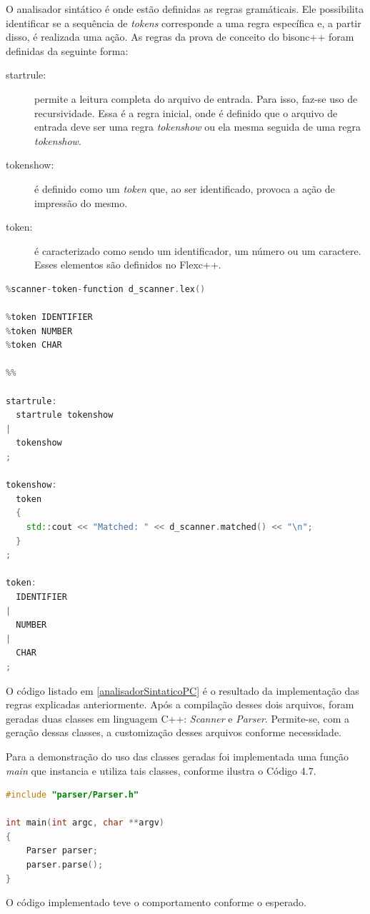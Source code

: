 \par 
\indent O analisador sintático é onde estão definidas as regras gramáticais. Ele possibilita identificar se a sequência de \textit{tokens} corresponde a uma regra específica e, a partir disso, é realizada uma ação. As regras da prova de conceito do bisonc++ foram definidas da seguinte forma:
\begin{description}
\item[startrule:] permite a leitura completa do arquivo de entrada. Para isso, faz-se uso de recursividade. Essa é a regra inicial, onde é definido que o arquivo de entrada deve ser uma regra \textit{tokenshow} ou ela mesma seguida de uma regra \textit{tokenshow}.
\item[tokenshow:] é definido como um \textit{token} que, ao ser identificado, provoca a ação de impressão do mesmo.
\item[token:] é caracterizado como sendo um identificador, um número ou um caractere. Esses elementos são definidos no Flexc++.
\end{description} 

\begin{lstlisting}[language=C++, label=analisadorSintaticoPC, caption=Analisador Sintático da Prova de Conceito do Bisonc++]
%scanner                ../scanner/Scanner.h
%scanner-token-function d_scanner.lex()

%token IDENTIFIER
%token NUMBER
%token CHAR

%%

startrule:
  startrule tokenshow
|
  tokenshow
;

tokenshow:
  token
  {
    std::cout << "Matched: " << d_scanner.matched() << "\n";
  }
;

token:
  IDENTIFIER
|
  NUMBER
|
  CHAR
;
\end{lstlisting}
\par
\indent O código listado em \ref{analisadorSintaticoPC} é o resultado da implementação das regras explicadas anteriormente. Após a compilação desses dois arquivos, foram geradas duas classes em linguagem C++: \textit{Scanner} e \textit{Parser}. Permite-se, com a geração dessas classes, a customização desses arquivos conforme necessidade.
\par
\indent Para a demonstração do uso das classes geradas foi implementada uma função \textit{main} que instancia e utiliza tais classes, conforme ilustra o Código 4.7.
\begin{lstlisting}[language=C++, label=mainPCB, caption=Função \textit{main} para demosntração do Bisonc++]
#include "parser/Parser.h"

int main(int argc, char **argv)
{
    Parser parser;
    parser.parse();
}
\end{lstlisting}
\par
\indent O código implementado teve o comportamento conforme o esperado.

